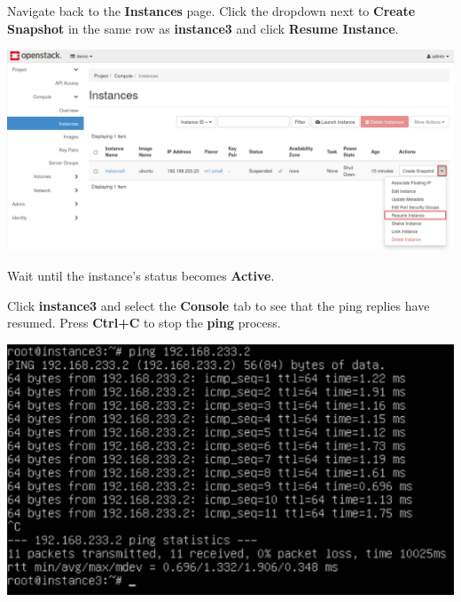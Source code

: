 \documentclass[letterpaper, 12pt]{article}
\begin{document}
\begin{enumerate}
    \begin{labstep}
        Navigate back to the \textbf{Instances} page.
        Click the dropdown next to \textbf{Create Snapshot} in the same row as \textbf{instance3} and click \textbf{Resume Instance}.

        \begin{center}
            \includegraphics[width=\linewidth]{images/part3/step15.png}
        \end{center}
    \end{labstep}

    \begin{stopbox}
        Wait until the instance's status becomes \textbf{Active}.
    \end{stopbox}

    \begin{labstep}
        Click \textbf{instance3} and select the \textbf{Console} tab to see that the ping replies have resumed.
        Press \textbf{Ctrl+C} to stop the \textbf{ping} process.

        \begin{center}
            \includegraphics[width=\linewidth]{images/part3/step16.png}
        \end{center}
    \end{labstep}


\end{enumerate}
\end{document}
